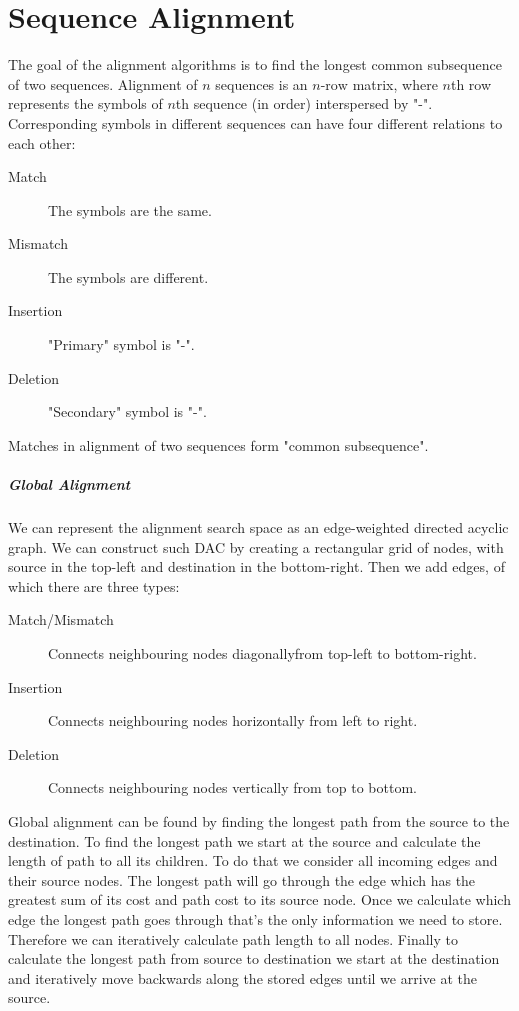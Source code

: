 \documentclass{report}
\begin{document}
\chapter{Sequence Alignment}
The goal of the alignment algorithms is to find the longest common subsequence of two sequences.
Alignment of $n$ sequences is an $n\text{-row}$ matrix, where $n$th row represents the symbols of $n$th sequence (in order) interspersed by "-".
Corresponding symbols in different sequences can have four different relations to each other:
\begin{description}
\item[Match] The symbols are the same.
\item[Mismatch] The symbols are different.
\item[Insertion] "Primary" symbol is "-".
\item[Deletion] "Secondary" symbol is "-".
\end{description}
Matches in alignment of two sequences form "common subsequence".
\paragraph{Global Alignment}
We can represent the alignment search space as an edge-weighted directed acyclic graph.
We can construct such DAC by creating a rectangular grid of nodes, with source in the top-left and destination in the bottom-right.
Then we add edges, of which there are three types:
\begin{description}
\item[Match/Mismatch] Connects neighbouring nodes diagonally\break from top-left to bottom-right.
\item[Insertion] Connects neighbouring nodes horizontally from left to right.
\item[Deletion] Connects neighbouring nodes vertically from top to bottom.
\end{description}
Global alignment can be found by finding the longest path from the source to the destination.
To find the longest path we start at the source and calculate the length of path to all its children.
To do that we consider all incoming edges and their source nodes.
The longest path will go through the edge which has the greatest sum of its cost and path cost to its source node.
Once we calculate which edge the longest path goes through that's the only information we need to store.
Therefore we can iteratively calculate path length to all nodes.
Finally to calculate the longest path from source to destination we start at the destination and iteratively move backwards along the stored edges until we arrive at the source.
\end{document}
